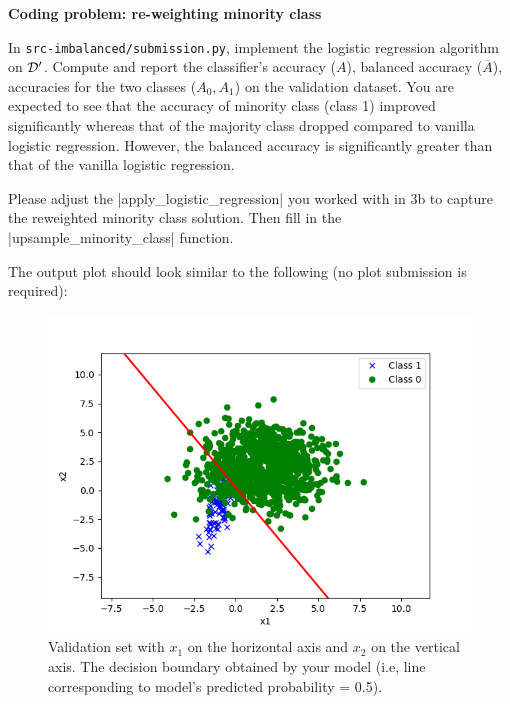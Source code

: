 \item {} \textbf{Coding problem: re-weighting minority class}

In \texttt{src-imbalanced/submission.py}, implement the logistic regression algorithm on $\mathcal{D}'$.  Compute and report the classifier's accuracy ($A$), balanced accuracy ($\overline{A}$), accuracies for the two classes ($A_0, A_1$) on the validation dataset. You are expected to see that the accuracy of minority class (class 1) improved significantly whereas that of the majority class dropped compared to vanilla logistic regression. However, the balanced accuracy is significantly greater than that of the vanilla logistic regression. 

Please adjust the |apply_logistic_regression| you worked with in 3b to capture the reweighted minority class solution. 
Then fill in the |upsample_minority_class| function. 

The output plot should look similar to the following (no plot submission is required):

\begin{figure}[H]
	\centering
	\vspace{2mm}
	\includegraphics[width=0.5\linewidth]{03-imbalanced/imbalanced_upsampling_pred.png}
	  \caption{Validation set with $x_1$ on the horizontal axis and $x_2$ on
	  the vertical axis. The decision boundary obtained by your model (i.e, line corresponding to model's predicted probability = 0.5).}
  \end{figure}